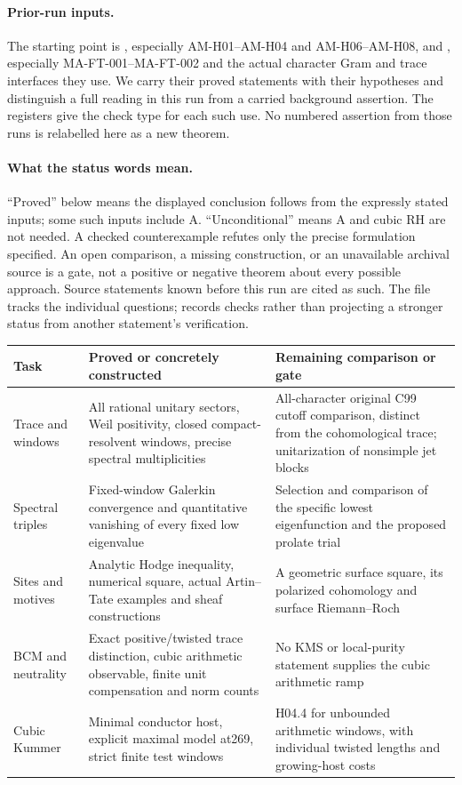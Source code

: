 \documentclass[11pt,a4paper]{article}
\theoremstyle{definition}
\theoremstyle{remark}
\begin{document}
\paragraph{Prior-run inputs.}
The starting point is
,
especially AM-H01--AM-H04 and AM-H06--AM-H08, and
,
especially MA-FT-001--MA-FT-002 and the actual character
Gram and trace interfaces they use. We carry their proved
statements with their hypotheses and distinguish a full
reading in this run from a carried background assertion.
The registers give the check type for each such use.
No numbered assertion from those runs is relabelled here
as a new theorem.

\paragraph{What the status words mean.}
``Proved'' below means the displayed conclusion follows
from the expressly stated inputs; some such inputs include A.
``Unconditional'' means A and cubic RH are not needed.
A checked counterexample refutes only the precise
formulation specified. An open comparison, a missing
construction, or an unavailable archival source is a
gate, not a positive or negative theorem about every
possible approach. Source statements known before this
run are cited as such. The file 
tracks the individual questions; 
records checks rather than projecting a stronger status
from another statement's verification.

\begin{center}
\begin{tabular}{p{}p{}p{}}
\toprule
Task & Proved or concretely constructed & Remaining comparison or gate\\
\midrule
Trace and windows & All rational unitary sectors, Weil positivity,
closed compact-resolvent windows, precise spectral multiplicities &
All-character original C99 cutoff comparison, distinct from the
cohomological trace; unitarization of nonsimple jet blocks\\
Spectral triples & Fixed-window Galerkin convergence and quantitative
vanishing of every fixed low eigenvalue & Selection and comparison of
the specific lowest eigenfunction and the proposed prolate trial\\
Sites and motives & Analytic Hodge inequality, numerical square,
actual Artin--Tate examples and sheaf constructions & A geometric
surface square, its polarized cohomology and surface Riemann--Roch\\
BCM and neutrality & Exact positive/twisted trace distinction, cubic
arithmetic observable, finite unit compensation and norm counts &
No KMS or local-purity statement supplies the cubic arithmetic ramp\\
Cubic Kummer & Minimal conductor host, explicit maximal model at269,
strict finite test windows & H04.4 for unbounded arithmetic windows,
with individual twisted lengths and growing-host costs\\
\bottomrule
\end{tabular}
\end{center}
\end{document}
